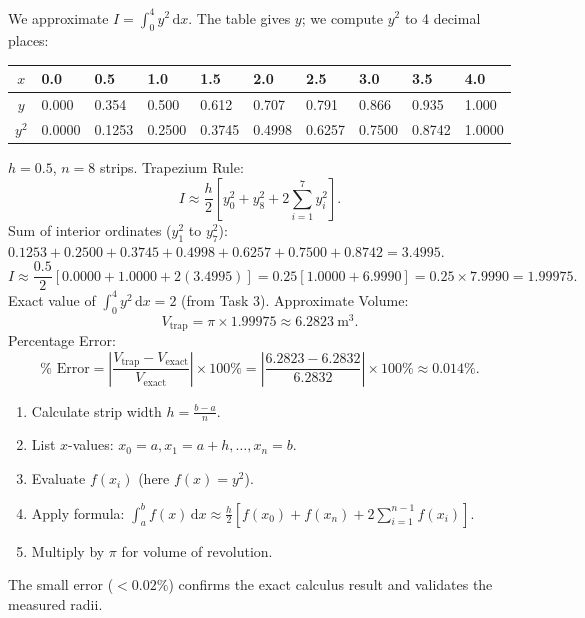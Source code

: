\documentclass[11pt]{article}
\begin{document}
\begin{exoresolu}
We approximate $I = \int_0^4 y^2\,\mathrm{d}x$. The table gives $y$; we compute $y^2$ to 4 decimal places:
\begin{center}
\begin{tabularx}{\linewidth}{|c|*{9}{X|}}\hline
\rowcolor{popblueL}
$x$ & 0.0 & 0.5 & 1.0 & 1.5 & 2.0 & 2.5 & 3.0 & 3.5 & 4.0 \\ \hline
$y$ & 0.000 & 0.354 & 0.500 & 0.612 & 0.707 & 0.791 & 0.866 & 0.935 & 1.000 \\ \hline
$y^2$ & 0.0000 & 0.1253 & 0.2500 & 0.3745 & 0.4998 & 0.6257 & 0.7500 & 0.8742 & 1.0000 \\ \hline
\end{tabularx}
\end{center}
$h = 0.5$, $n=8$ strips. Trapezium Rule:
\[
I \approx \frac{h}{2} \left[ y_0^2 + y_8^2 + 2\sum_{i=1}^{7} y_i^2 \right].
\]
Sum of interior ordinates ($y_1^2$ to $y_7^2$):
$0.1253 + 0.2500 + 0.3745 + 0.4998 + 0.6257 + 0.7500 + 0.8742 = 3.4995$.
\[
I \approx \frac{0.5}{2} \left[ 0.0000 + 1.0000 + 2(3.4995) \right] = 0.25 \left[ 1.0000 + 6.9990 \right] = 0.25 \times 7.9990 = 1.99975.
\]
Exact value of $\int_0^4 y^2\,\mathrm{d}x = 2$ (from Task 3).
Approximate Volume:
\[
V_{\text{trap}} = \pi \times 1.99975 \approx 6.2823\ \mathrm{m}^3.
\]
Percentage Error:
\[
\%\text{ Error} = \left| \frac{V_{\text{trap}} - V_{\text{exact}}}{V_{\text{exact}}} \right| \times 100\% = \left| \frac{6.2823 - 6.2832}{6.2832} \right| \times 100\% \approx 0.014\%.
\]
\end{exoresolu}

\begin{methode}
\begin{enumerate}
    \item Calculate strip width $h = \frac{b-a}{n}$.
    \item List $x$-values: $x_0=a, x_1=a+h, \dots, x_n=b$.
    \item Evaluate $f(x_i)$ (here $f(x)=y^2$).
    \item Apply formula: $\int_a^b f(x)\,\mathrm{d}x \approx \frac{h}{2}[f(x_0)+f(x_n)+2\sum_{i=1}^{n-1}f(x_i)]$.
    \item Multiply by $\pi$ for volume of revolution.
\end{enumerate}
The small error ($<0.02\%$) confirms the exact calculus result and validates the measured radii.
\end{methode}
\end{document}
